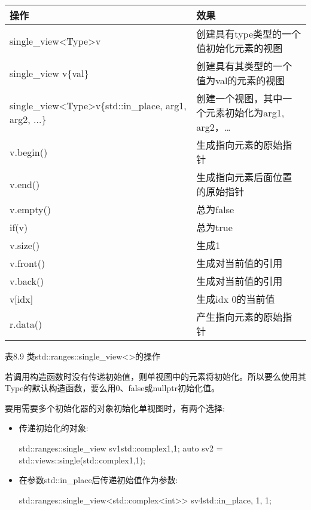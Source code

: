 \begin{longtable}[c]{|l|l|}
\hline
\textbf{操作} & \textbf{效果}                                         \\ \hline
\endfirsthead
%
\endhead
%
single\_view\textless{}Type\textgreater v                                    & 创建具有type类型的一个值初始化元素的视图   \\ \hline
single\_view v\{val\}                                                        & 创建具有其类型的一个值为val的元素的视图         \\ \hline
single\_view\textless{}Type\textgreater v\{std::in\_place, arg1, arg2, ...\} & 创建一个视图，其中一个元素初始化为arg1, arg2，… \\ \hline
v.begin()          & 生成指向元素的原始指针                     \\ \hline
v.end()            & 生成指向元素后面位置的原始指针 \\ \hline
v.empty()          & 总为false                                            \\ \hline
if(v)              & 总为true                                             \\ \hline
v.size()           & 生成1                                                \\ \hline
v.front()          & 生成对当前值的引用                 \\ \hline
v.back()           & 生成对当前值的引用                 \\ \hline
v{[}idx{]}         & 生成idx 0的当前值                      \\ \hline
r.data()           & 产生指向元素的原始指针                     \\ \hline
\end{longtable}

\begin{center}
表8.9 类std::ranges::single\_view<>的操作
\end{center}

若调用构造函数时没有传递初始值，则单视图中的元素将初始化。所以要么使用其Type的默认构造函数，要么用0、false或nullptr初始化值。

要用需要多个初始化器的对象初始化单视图时，有两个选择:

\begin{itemize}
\item
传递初始化的对象:

\begin{cpp}
std::ranges::single_view sv1{std::complex{1,1}};
auto sv2 = std::views::single(std::complex{1,1});
\end{cpp}

\item
在参数std::in\_place后传递初始值作为参数:

\begin{cpp}
std::ranges::single_view<std::complex<int>> sv4{std::in_place, 1, 1};
\end{cpp}
\end{itemize}

